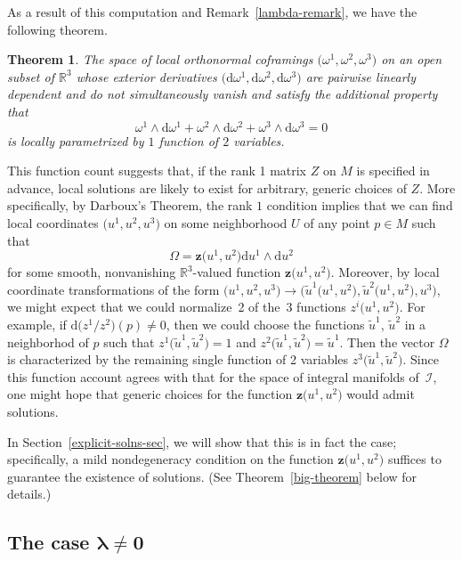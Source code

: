 \documentclass[pdftex]{sigma}
\numberwithin{equation}{section}
\newtheorem{Theorem}{Theorem}[section]
\renewcommand{\d}{\mathrm{d}}%
\newcommand{\cI}{{\mathcal I}}
\newcommand{\bbR}{{\mathbb R}}
\newcommand{\mbz}{\mathbf{z}}
\begin{document}
As a result of this computation and Remark~\ref{lambda-remark}, we have the following theorem.

\begin{Theorem}\label{lambda-zero-function-count-theorem}
The space of local orthonormal coframings $\big(\omega^1, \omega^2, \omega^3\big)$ on an open subset of $\bbR^3$ whose exterior derivatives $\big(\d\omega^1, \d\omega^2, \d\omega^3\big)$ are pairwise linearly dependent and do not simultaneously vanish and satisfy the additional property that
\[ \omega^1 \wedge \d \omega^1 + \omega^2 \wedge \d \omega^2 + \omega^3 \wedge \d \omega^3 = 0 \]
is locally parametrized by $1$ function of $2$ variables.
\end{Theorem}

This function count suggests that, if the rank 1 matrix $Z$ on $M$ is specified in advance, local solutions are likely to exist for arbitrary, generic choices of $Z$. More specifically, by Darboux's Theorem, the rank $1$ condition implies that we can find local coordinates $\big(u^1, u^2, u^3\big)$ on some neighborhood $U$ of any point $p \in M$ such that
\[ \Omega = \mbz\big(u^1, u^2\big) \d u^1 \wedge \d u^2 \]
for some smooth, nonvanishing $\bbR^3$-valued function $\mbz\big(u^1, u^2\big)$. Moreover, by local coordinate transformations of the form $\big(u^1, u^2, u^3\big) \to \big(\tilde{u}^1\big(u^1, u^2\big), \tilde{u}^2\big(u^1, u^2\big), u^3\big)$, we might expect that we could normalize~2 of the~3 functions $z^i\big(u^1, u^2\big)$. For example, if $\d\big(z^1/z^2\big)(p) \neq 0$, then we could choose the functions $\tilde{u}^1$, $\tilde{u}^2$ in a neighborhod of $p$ such that $z^1\big(\tilde{u}^1, \tilde{u}^2\big) = 1$ and $z^2\big(\tilde{u}^1, \tilde{u}^2\big) = \tilde{u}^1$. Then the vector $\Omega$ is characterized by the remaining single function of 2 variables $z^3\big(\tilde{u}^1, \tilde{u}^2\big)$. Since this function account agrees with that for the space of integral manifolds of~$\cI$, one might hope that generic choices for the function $\mbz\big(u^1, u^2\big)$ would admit solutions.

In Section~\ref{explicit-solns-sec}, we will show that this is in fact the case; specifically, a mild nondege\-ne\-ra\-cy condition on the function $\mbz\big(u^1, u^2\big)$ suffices to guarantee the existence of solutions. (See Theorem~\ref{big-theorem} below for details.)

\subsection[The case $\lambda \neq 0$]{The case $\boldsymbol{\lambda \neq 0}$}
\end{document}
